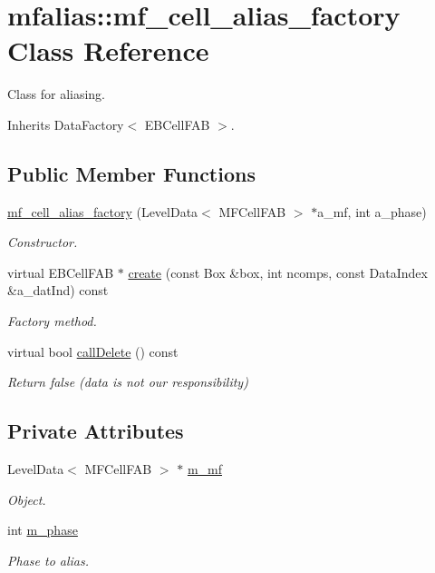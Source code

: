 \hypertarget{classmfalias_1_1mf__cell__alias__factory}{}\section{mfalias\+:\+:mf\+\_\+cell\+\_\+alias\+\_\+factory Class Reference}
\label{classmfalias_1_1mf__cell__alias__factory}


Class for aliasing.  




Inherits Data\+Factory$<$ E\+B\+Cell\+F\+A\+B $>$.

\subsection*{Public Member Functions}
\begin{DoxyCompactItemize}
\item 
\hyperlink{classmfalias_1_1mf__cell__alias__factory_ad8bd9d85256f30496db3b60ea88276b5}{mf\+\_\+cell\+\_\+alias\+\_\+factory} (Level\+Data$<$ M\+F\+Cell\+F\+AB $>$ $\ast$a\+\_\+mf, int a\+\_\+phase)
\begin{DoxyCompactList}\small\item\em Constructor. \end{DoxyCompactList}\item 
virtual E\+B\+Cell\+F\+AB $\ast$ \hyperlink{classmfalias_1_1mf__cell__alias__factory_a4571889b080fba76d6b941e9f41f950a}{create} (const Box \&box, int ncomps, const Data\+Index \&a\+\_\+dat\+Ind) const 
\begin{DoxyCompactList}\small\item\em Factory method. \end{DoxyCompactList}\item 
virtual bool \hyperlink{classmfalias_1_1mf__cell__alias__factory_ae9a6bf05250d35631f5543e129897a3e}{call\+Delete} () const 
\begin{DoxyCompactList}\small\item\em Return false (data is not our responsibility) \end{DoxyCompactList}\end{DoxyCompactItemize}
\subsection*{Private Attributes}
\begin{DoxyCompactItemize}
\item 
Level\+Data$<$ M\+F\+Cell\+F\+AB $>$ $\ast$ \hyperlink{classmfalias_1_1mf__cell__alias__factory_a902714c5872780711530819797b6e82c}{m\+\_\+mf}
\begin{DoxyCompactList}\small\item\em Object. \end{DoxyCompactList}\item 
int \hyperlink{classmfalias_1_1mf__cell__alias__factory_afd7fb3dcdfd16ca15f52fec542b32c43}{m\+\_\+phase}
\begin{DoxyCompactList}\small\item\em Phase to alias. \end{DoxyCompactList}\end{DoxyCompactItemize}


